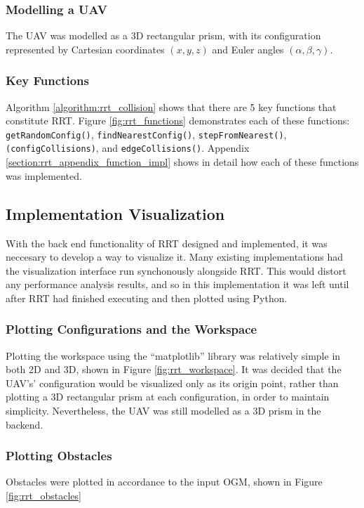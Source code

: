     \subsubsection{Modelling a \gls{UAV}}
        The \gls{UAV} was modelled as a \gls{3D} rectangular prism, with its configuration represented by Cartesian coordinates $(x,y,z)$ and Euler angles $(\alpha, \beta, \gamma)$.

    \subsubsection{Key Functions}
        Algorithm \ref{algorithm:rrt_collision} shows that there are 5 key functions that constitute \gls{RRT}. Figure \ref{fig:rrt_functions} demonstrates each of these functions: \texttt{getRandomConfig()}, \texttt{findNearestConfig()}, \texttt{stepFromNearest()}, \texttt{(configCollisions)}, and \texttt{edgeCollisions()}. Appendix \ref{section:rrt_appendix_function_impl} shows in detail how each of these functions was implemented.
        

\newpage
\subsection{Implementation Visualization}
    With the back end functionality of \gls{RRT} designed and implemented, it was neccesary to develop a way to visualize it. Many existing implementations had the visualization interface run synchonously alongside \gls{RRT}. This would distort any performance analysis results, and so in this implementation it was left until after \gls{RRT} had finished executing and then plotted using Python.

    \subsubsection{Plotting Configurations and the Workspace}
        Plotting the workspace using the ``matplotlib'' library was relatively simple in both \gls{2D} and \gls{3D}, shown in Figure \ref{fig:rrt_workspace}. It was decided that the \gls{UAV}'s' configuration would be visualized only as its origin point, rather than plotting a \gls{3D} rectangular prism at each configuration, in order to maintain simplicity. Nevertheless, the \gls{UAV} was still modelled as a 3D prism in the backend.
        

    \subsubsection{Plotting Obstacles}
        Obstacles were plotted in accordance to the input \gls{OGM}, shown in Figure \ref{fig:rrt_obstacles}

